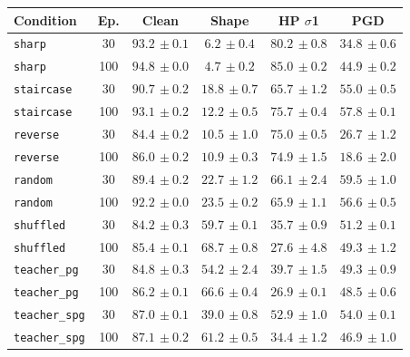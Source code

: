 \begin{tabular}{lccccc}
\hline
Condition & Ep. & Clean & Shape & HP $\sigma$1 & PGD \\
\hline
\texttt{sharp} & 30 & $93.2{\scriptstyle\,\pm0.1}$ & $6.2{\scriptstyle\,\pm0.4}$ & $80.2{\scriptstyle\,\pm0.8}$ & $34.8{\scriptstyle\,\pm0.6}$ \\
\texttt{sharp} & 100 & $94.8{\scriptstyle\,\pm0.0}$ & $4.7{\scriptstyle\,\pm0.2}$ & $85.0{\scriptstyle\,\pm0.2}$ & $44.9{\scriptstyle\,\pm0.2}$ \\
\texttt{staircase} & 30 & $90.7{\scriptstyle\,\pm0.2}$ & $18.8{\scriptstyle\,\pm0.7}$ & $65.7{\scriptstyle\,\pm1.2}$ & $55.0{\scriptstyle\,\pm0.5}$ \\
\texttt{staircase} & 100 & $93.1{\scriptstyle\,\pm0.2}$ & $12.2{\scriptstyle\,\pm0.5}$ & $75.7{\scriptstyle\,\pm0.4}$ & $57.8{\scriptstyle\,\pm0.1}$ \\
\texttt{reverse} & 30 & $84.4{\scriptstyle\,\pm0.2}$ & $10.5{\scriptstyle\,\pm1.0}$ & $75.0{\scriptstyle\,\pm0.5}$ & $26.7{\scriptstyle\,\pm1.2}$ \\
\texttt{reverse} & 100 & $86.0{\scriptstyle\,\pm0.2}$ & $10.9{\scriptstyle\,\pm0.3}$ & $74.9{\scriptstyle\,\pm1.5}$ & $18.6{\scriptstyle\,\pm2.0}$ \\
\texttt{random} & 30 & $89.4{\scriptstyle\,\pm0.2}$ & $22.7{\scriptstyle\,\pm1.2}$ & $66.1{\scriptstyle\,\pm2.4}$ & $59.5{\scriptstyle\,\pm1.0}$ \\
\texttt{random} & 100 & $92.2{\scriptstyle\,\pm0.0}$ & $23.5{\scriptstyle\,\pm0.2}$ & $65.9{\scriptstyle\,\pm1.1}$ & $56.6{\scriptstyle\,\pm0.5}$ \\
\texttt{shuffled} & 30 & $84.2{\scriptstyle\,\pm0.3}$ & $59.7{\scriptstyle\,\pm0.1}$ & $35.7{\scriptstyle\,\pm0.9}$ & $51.2{\scriptstyle\,\pm0.1}$ \\
\texttt{shuffled} & 100 & $85.4{\scriptstyle\,\pm0.1}$ & $68.7{\scriptstyle\,\pm0.8}$ & $27.6{\scriptstyle\,\pm4.8}$ & $49.3{\scriptstyle\,\pm1.2}$ \\
\texttt{teacher\_pg} & 30 & $84.8{\scriptstyle\,\pm0.3}$ & $54.2{\scriptstyle\,\pm2.4}$ & $39.7{\scriptstyle\,\pm1.5}$ & $49.3{\scriptstyle\,\pm0.9}$ \\
\texttt{teacher\_pg} & 100 & $86.2{\scriptstyle\,\pm0.1}$ & $66.6{\scriptstyle\,\pm0.4}$ & $26.9{\scriptstyle\,\pm0.1}$ & $48.5{\scriptstyle\,\pm0.6}$ \\
\texttt{teacher\_spg} & 30 & $87.0{\scriptstyle\,\pm0.1}$ & $39.0{\scriptstyle\,\pm0.8}$ & $52.9{\scriptstyle\,\pm1.0}$ & $54.0{\scriptstyle\,\pm0.1}$ \\
\texttt{teacher\_spg} & 100 & $87.1{\scriptstyle\,\pm0.2}$ & $61.2{\scriptstyle\,\pm0.5}$ & $34.4{\scriptstyle\,\pm1.2}$ & $46.9{\scriptstyle\,\pm1.0}$ \\
\hline
\end{tabular}
